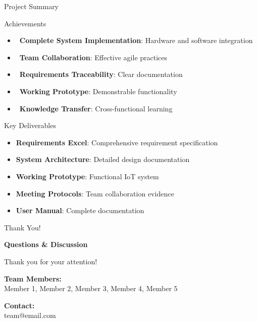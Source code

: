 \documentclass[aspectratio=169]{beamer}
\begin{document}
\begin{frame}{Project Summary}
\begin{block}{Achievements}
\begin{itemize}
    \item \checkmark~\textbf{Complete System Implementation}: Hardware and software integration
    \item \checkmark~\textbf{Team Collaboration}: Effective agile practices
    \item \checkmark~\textbf{Requirements Traceability}: Clear documentation
    \item \checkmark~\textbf{Working Prototype}: Demonstrable functionality
    \item \checkmark~\textbf{Knowledge Transfer}: Cross-functional learning
\end{itemize}
\end{block}

\begin{block}{Key Deliverables}
\begin{itemize}
    \item \textbf{Requirements Excel}: Comprehensive requirement specification
    \item \textbf{System Architecture}: Detailed design documentation
    \item \textbf{Working Prototype}: Functional IoT system
    \item \textbf{Meeting Protocols}: Team collaboration evidence
    \item \textbf{User Manual}: Complete documentation
\end{itemize}
\end{block}
\end{frame}

\begin{frame}{Thank You!}
\begin{center}
\Huge \textbf{Questions \& Discussion}

\vspace{1cm}

\large Thank you for your attention!

\vspace{0.5cm}

\normalsize
\textbf{Team Members:} \\
Member 1, Member 2, Member 3, Member 4, Member 5

\vspace{0.5cm}

\textbf{Contact:} \\
team@email.com
\end{center}
\end{frame}
\end{document}
